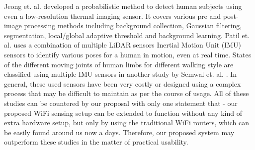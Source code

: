 \documentclass[conference]{IEEEtran}
\begin{document}
Jeong et. al.\cite{jeong_thermal} developed a probabilistic method to detect human subjects using even a low-resolution thermal imaging sensor. It covers various pre and post-image processing methods including background collection, Gaussian filtering, segmentation, local/global adaptive threshold and background learning. Patil et. al. \cite{imu_lidar} uses a combination of multiple LiDAR sensors Inertial Motion Unit (IMU) sensors to identify various poses for a human in motion, even at real time. States of the different moving joints of human limbs for different walking style are classified using multiple IMU sensors in another study by Semwal et. al. \cite{semwal}.
In general, these used sensors have been very costly or designed using a complex process that may be difficult to maintain as per the course of usage. All of these studies can be countered by our proposal with only one statement that - our proposed WiFi sensing setup can be extended to function without any kind of extra hardware setup, but only by using the traditional WiFi routers, which can be easily found around us now a days. Therefore, our proposed system may outperform these studies in the matter of practical usability.
\end{document}
